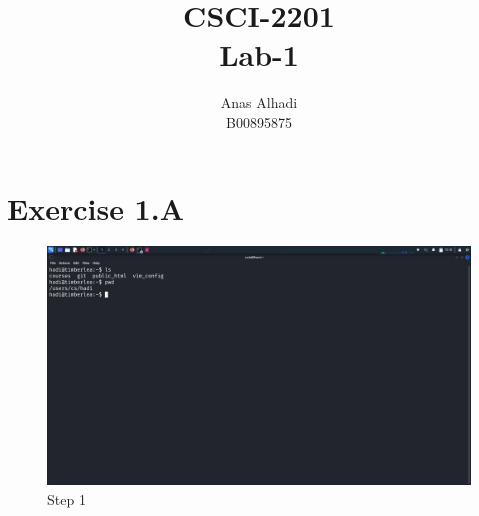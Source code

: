 \documentclass{article}
\title{\textbf{CSCI-2201\\Lab-1}}
\author{Anas Alhadi\\B00895875}
\numberwithin{equation}{subsection}
\begin{document}
	\maketitle

	\vspace{20pt}
	\tableofcontents	

	\newpage

	\vspace{25pt}
	\section{Exercise 1.A}
		\begin{figure}[h]
			\caption{Step 1}
			\includegraphics[width=450pt]{images/e1qA/1.png}
	\end{figure}
	
\end{document}
